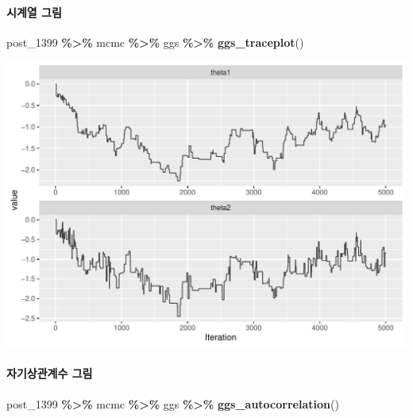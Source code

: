 \documentclass[
]{article}
\newenvironment{Shaded}{\begin{snugshade}}{\end{snugshade}}
\newcommand{\FunctionTok}[1]{\textcolor[rgb]{0.13,0.29,0.53}{\textbf{#1}}}
\newcommand{\NormalTok}[1]{#1}
\newcommand{\SpecialCharTok}[1]{\textcolor[rgb]{0.81,0.36,0.00}{\textbf{#1}}}
\begin{document}
\paragraph{시계열 그림}\label{uxc2dcuxacc4uxc5f4-uxadf8uxb9bc-2}

\begin{Shaded}
\begin{Highlighting}[]
\NormalTok{post\_1399 }\SpecialCharTok{\%\textgreater{}\%}\NormalTok{ mcmc }\SpecialCharTok{\%\textgreater{}\%}\NormalTok{ ggs }\SpecialCharTok{\%\textgreater{}\%} \FunctionTok{ggs\_traceplot}\NormalTok{()}
\end{Highlighting}
\end{Shaded}

\begin{center}\includegraphics[width=0.8\linewidth]{Bayes_stat_hw3_files/figure-latex/unnamed-chunk-21-1} \end{center}

\paragraph{자기상관계수
그림}\label{uxc790uxae30uxc0c1uxad00uxacc4uxc218-uxadf8uxb9bc-2}

\begin{Shaded}
\begin{Highlighting}[]
\NormalTok{post\_1399 }\SpecialCharTok{\%\textgreater{}\%}\NormalTok{ mcmc }\SpecialCharTok{\%\textgreater{}\%}\NormalTok{ ggs }\SpecialCharTok{\%\textgreater{}\%} \FunctionTok{ggs\_autocorrelation}\NormalTok{()}
\end{Highlighting}
\end{Shaded}
\end{document}
